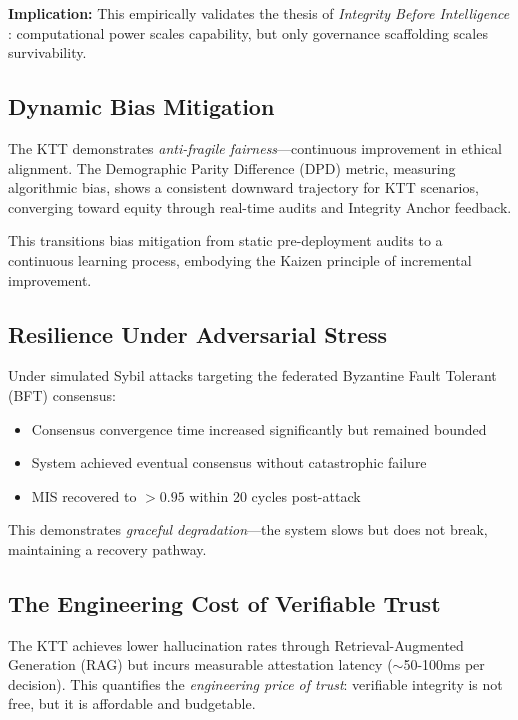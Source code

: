 \documentclass[11pt,letterpaper]{article}
\begin{document}
\textbf{Implication:} This empirically validates the thesis of \textit{Integrity Before Intelligence} \citep{judan2025integrity}: computational power scales capability, but only governance scaffolding scales survivability.

\subsection{Dynamic Bias Mitigation}

The KTT demonstrates \textit{anti-fragile fairness}—continuous improvement in ethical alignment. The Demographic Parity Difference (DPD) metric, measuring algorithmic bias, shows a consistent downward trajectory for KTT scenarios, converging toward equity through real-time audits and Integrity Anchor feedback.

This transitions bias mitigation from static pre-deployment audits to a continuous learning process, embodying the Kaizen principle of incremental improvement.

\subsection{Resilience Under Adversarial Stress}

Under simulated Sybil attacks targeting the federated Byzantine Fault Tolerant (BFT) consensus:
\begin{itemize}
    \item Consensus convergence time increased significantly but remained bounded
    \item System achieved eventual consensus without catastrophic failure
    \item MIS recovered to $>0.95$ within 20 cycles post-attack
\end{itemize}

This demonstrates \textit{graceful degradation}—the system slows but does not break, maintaining a recovery pathway.

\subsection{The Engineering Cost of Verifiable Trust}

The KTT achieves lower hallucination rates through Retrieval-Augmented Generation (RAG) but incurs measurable attestation latency ($\sim$50-100ms per decision). This quantifies the \textit{engineering price of trust}: verifiable integrity is not free, but it is affordable and budgetable.
\end{document}
